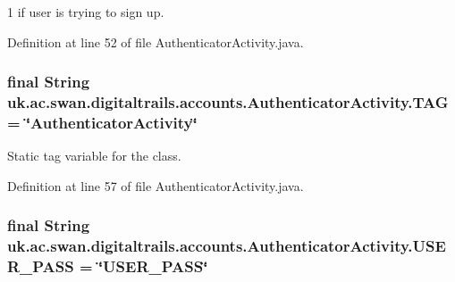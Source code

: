 1 if user is trying to sign up. 



Definition at line 52 of file Authenticator\+Activity.\+java.

\hypertarget{classuk_1_1ac_1_1swan_1_1digitaltrails_1_1accounts_1_1_authenticator_activity_a527c07643f84f2555652d817b36e3eb7}{
\subsubsection[{T\+A\+G}]{\setlength{\rightskip}{0pt plus 5cm}final String uk.\+ac.\+swan.\+digitaltrails.\+accounts.\+Authenticator\+Activity.\+T\+A\+G = \char`\"{}Authenticator\+Activity\char`\"{}\hspace{0.3cm}{\ttfamily [private]}}}\label{classuk_1_1ac_1_1swan_1_1digitaltrails_1_1accounts_1_1_authenticator_activity_a527c07643f84f2555652d817b36e3eb7}


Static tag variable for the class. 



Definition at line 57 of file Authenticator\+Activity.\+java.

\hypertarget{classuk_1_1ac_1_1swan_1_1digitaltrails_1_1accounts_1_1_authenticator_activity_a8ea4980e7fab8bd02125c9a36bbe4b2d}{
\subsubsection[{U\+S\+E\+R\+\_\+\+P\+A\+S\+S}]{\setlength{\rightskip}{0pt plus 5cm}final String uk.\+ac.\+swan.\+digitaltrails.\+accounts.\+Authenticator\+Activity.\+U\+S\+E\+R\+\_\+\+P\+A\+S\+S = \char`\"{}U\+S\+E\+R\+\_\+\+P\+A\+S\+S\char`\"{}\hspace{0.3cm}{\ttfamily [static]}}}\label{classuk_1_1ac_1_1swan_1_1digitaltrails_1_1accounts_1_1_authenticator_activity_a8ea4980e7fab8bd02125c9a36bbe4b2d}


